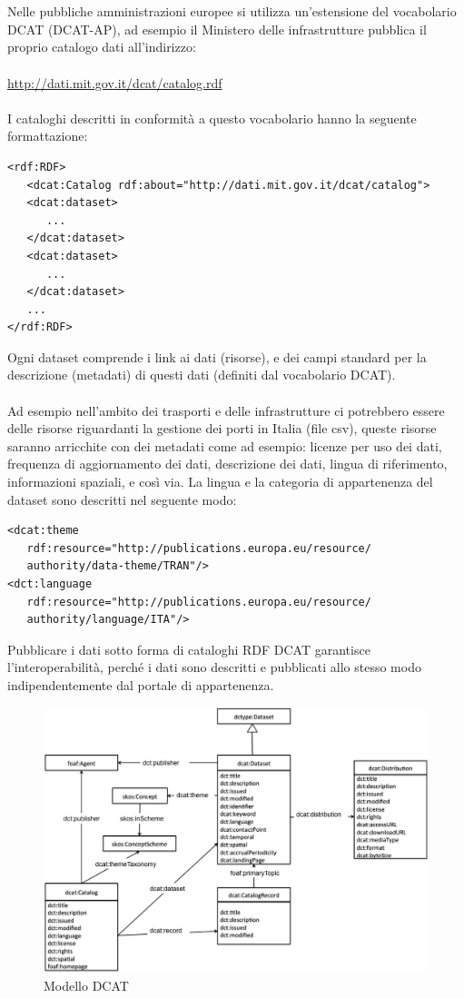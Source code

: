 \documentclass{article}
\theoremstyle{plain}
\theoremstyle{definition}
\begin{document}
\\
\\
Nelle pubbliche amministrazioni europee si utilizza un'estensione del vocabolario DCAT (DCAT-AP), ad esempio il Ministero delle infrastrutture pubblica il proprio catalogo dati all'indirizzo:
\\
\\
\url{http://dati.mit.gov.it/dcat/catalog.rdf}
\\
\\
I cataloghi descritti in conformità a questo vocabolario hanno la seguente formattazione: 
\begin{verbatim}
<rdf:RDF>
   <dcat:Catalog rdf:about="http://dati.mit.gov.it/dcat/catalog">
   <dcat:dataset>
      ...
   </dcat:dataset>
   <dcat:dataset>
      ...
   </dcat:dataset>
   ...
</rdf:RDF>
\end{verbatim}
Ogni dataset comprende i link ai dati (risorse), e dei campi standard per la descrizione (metadati) di questi dati (definiti dal vocabolario DCAT).
\\
\\
Ad esempio nell'ambito dei trasporti e delle infrastrutture ci potrebbero essere delle risorse riguardanti la gestione dei porti in Italia (file csv), queste risorse saranno arricchite con dei metadati come ad esempio: licenze per uso dei dati, frequenza di aggiornamento dei dati, descrizione dei dati, lingua di riferimento, informazioni spaziali, e così via. La lingua e la categoria di appartenenza del dataset sono descritti nel seguente modo:
\begin{verbatim}
<dcat:theme 
   rdf:resource="http://publications.europa.eu/resource/
   authority/data-theme/TRAN"/>
<dct:language 
   rdf:resource="http://publications.europa.eu/resource/     
   authority/language/ITA"/>
\end{verbatim}
Pubblicare i dati sotto forma di cataloghi RDF DCAT garantisce l'interoperabilità, perché i dati sono descritti e pubblicati allo stesso modo indipendentemente dal portale di appartenenza.

\begin{figure}[htbp]
\begin{center}
\includegraphics[scale=0.40]{img/dcatmodel.jpg}
\caption{Modello DCAT}
\end{center}
\end{figure}
\end{document}
